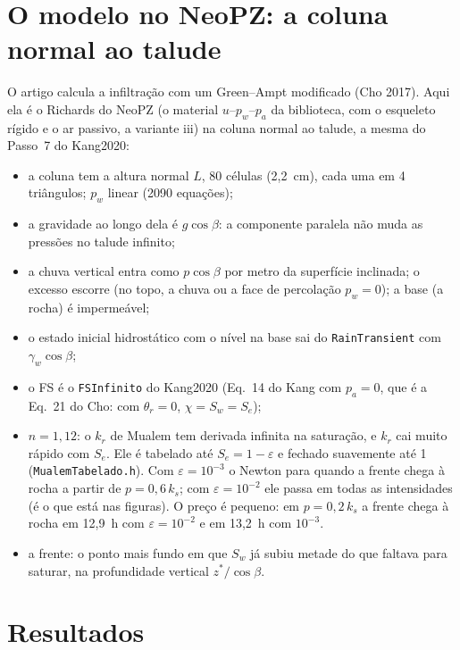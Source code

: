 \documentclass[11pt,a4paper]{article}
\begin{document}
\section{O modelo no NeoPZ: a coluna normal ao talude}
O artigo calcula a infiltração com um Green--Ampt modificado (Cho 2017). Aqui ela é o Richards do NeoPZ (o material
$u$--$p_w$--$p_a$ da biblioteca, com o esqueleto rígido e o ar passivo, a variante iii) na coluna normal ao talude, a
mesma do Passo~7 do Kang2020:
\begin{itemize}
  \item a coluna tem a altura normal $L$, 80 células (2,2~cm), cada uma em 4 triângulos; $p_w$ linear (2090 equações);
  \item a gravidade ao longo dela é $g\cos\beta$: a componente paralela não muda as pressões no talude infinito;
  \item a chuva vertical entra como $p\cos\beta$ por metro da superfície inclinada; o excesso escorre (no topo, a chuva
    ou a face de percolação $p_w = 0$); a base (a rocha) é impermeável;
  \item o estado inicial hidrostático com o nível na base sai do \texttt{RainTransient} com $\gamma_w\cos\beta$;
  \item o FS é o \texttt{FSInfinito} do Kang2020 (Eq.~14 do Kang com $p_a = 0$, que é a Eq.~21 do Cho: com
    $\theta_r = 0$, $\chi = S_w = S_e$);
  \item $n = 1{,}12$: o $k_r$ de Mualem tem derivada infinita na saturação, e $k_r$ cai muito rápido com $S_e$. Ele é
    tabelado até $S_e = 1 - \varepsilon$ e fechado suavemente até 1 (\texttt{MualemTabelado.h}). Com
    $\varepsilon = 10^{-3}$ o Newton para quando a frente chega à rocha a partir de $p = 0{,}6\,k_s$; com
    $\varepsilon = 10^{-2}$ ele passa em todas as intensidades (é o que está nas figuras). O preço é pequeno: em
    $p = 0{,}2\,k_s$ a frente chega à rocha em 12,9~h com $\varepsilon = 10^{-2}$ e em 13,2~h com $10^{-3}$.
  \item a frente: o ponto mais fundo em que $S_w$ já subiu metade do que faltava para saturar, na profundidade vertical
    $z^*/\cos\beta$.
\end{itemize}

\section{Resultados}
\begin{table}[H]\centering\small
\caption{O tempo em que a frente chega à rocha (o instante da ruptura) e o FS, NeoPZ e Cho (2020) (lido das Figs.~3 e 4,
$\pm 0{,}2$~h).}\label{tab:tempos}

\end{table}
\end{document}

